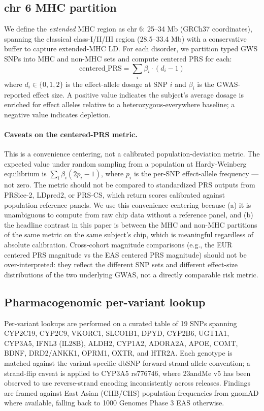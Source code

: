 \documentclass[11pt,a4paper]{article}
\begin{document}
\subsection{chr 6 MHC partition}
We define the \emph{extended} MHC region as chr 6: 25--34 Mb (GRCh37 coordinates), spanning the classical class-I/II/III region (28.5--33.4 Mb) with a conservative buffer to capture extended-MHC LD. For each disorder, we partition typed GWS SNPs into MHC and non-MHC sets and compute centered PRS for each:
\[
\text{centered\_PRS} = \sum_{i} \beta_i \cdot (d_i - 1)
\]
where $d_i \in \{0, 1, 2\}$ is the effect-allele dosage at SNP $i$ and $\beta_i$ is the GWAS-reported effect size. A positive value indicates the subject's average dosage is enriched for effect alleles relative to a heterozygous-everywhere baseline; a negative value indicates depletion.

\paragraph{Caveats on the centered-PRS metric.} This is a convenience centering, not a calibrated population-deviation metric. The expected value under random sampling from a population at Hardy-Weinberg equilibrium is $\sum_i \beta_i (2p_i - 1)$, where $p_i$ is the per-SNP effect-allele frequency --- not zero. The metric should not be compared to standardized PRS outputs from PRSice-2, LDpred2, or PRS-CS, which return scores calibrated against population reference panels. We use this convenience centering because (a) it is unambiguous to compute from raw chip data without a reference panel, and (b) the headline contrast in this paper is between the MHC and non-MHC partitions of the same metric on the same subject's chip, which is meaningful regardless of absolute calibration. Cross-cohort magnitude comparisons (e.g., the EUR centered PRS magnitude vs the EAS centered PRS magnitude) should not be over-interpreted: they reflect the different SNP sets and different effect-size distributions of the two underlying GWAS, not a directly comparable risk metric.

\subsection{Pharmacogenomic per-variant lookup}
Per-variant lookups are performed on a curated table of 19 SNPs spanning CYP2C19, CYP2C9, VKORC1, SLCO1B1, DPYD, CYP2B6, UGT1A1, CYP3A5, IFNL3 (IL28B), ALDH2, CYP1A2, ADORA2A, APOE, COMT, BDNF, DRD2/ANKK1, OPRM1, OXTR, and HTR2A. Each genotype is matched against the variant-specific dbSNP forward-strand allele convention; a strand-flip caveat is applied to CYP3A5 rs776746, where 23andMe v5 has been observed to use reverse-strand encoding inconsistently across releases. Findings are framed against East Asian (CHB/CHS) population frequencies from gnomAD where available, falling back to 1000 Genomes Phase 3 EAS otherwise.
\end{document}
